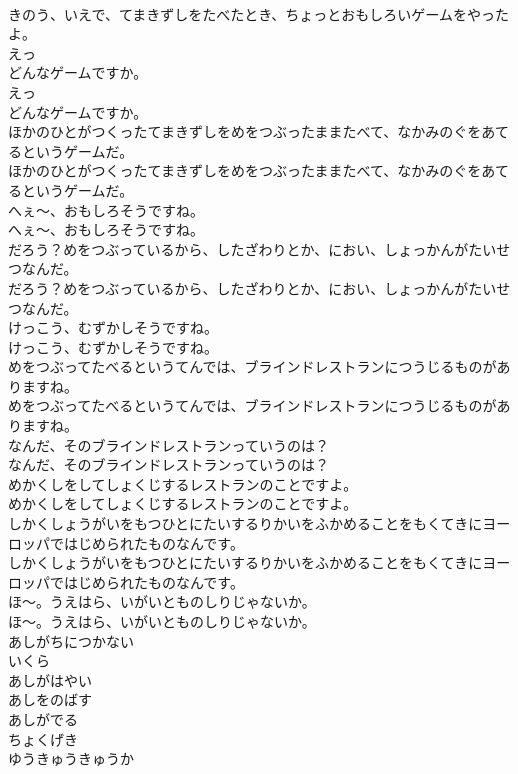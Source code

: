 \documentclass[8pt]{extreport}
\begin{document}
\begin{CJK}{UTF8}{min}
\\	きのう、いえで、てまきずしをたべたとき、ちょっとおもしろいゲームをやったよ。
\\	えっ
\\	どんなゲームですか。
\\	えっ
\\	どんなゲームですか。
\\	ほかのひとがつくったてまきずしをめをつぶったままたべて、なかみのぐをあてるというゲームだ。
\\	ほかのひとがつくったてまきずしをめをつぶったままたべて、なかみのぐをあてるというゲームだ。
\\	へぇ～、おもしろそうですね。
\\	へぇ～、おもしろそうですね。
\\	だろう？めをつぶっているから、したざわりとか、におい、しょっかんがたいせつなんだ。
\\	だろう？めをつぶっているから、したざわりとか、におい、しょっかんがたいせつなんだ。
\\	けっこう、むずかしそうですね。
\\	けっこう、むずかしそうですね。
\\	めをつぶってたべるというてんでは、ブラインドレストランにつうじるものがありますね。
\\	めをつぶってたべるというてんでは、ブラインドレストランにつうじるものがありますね。
\\	なんだ、そのブラインドレストランっていうのは？
\\	なんだ、そのブラインドレストランっていうのは？
\\	めかくしをしてしょくじするレストランのことですよ。
\\	めかくしをしてしょくじするレストランのことですよ。
\\	しかくしょうがいをもつひとにたいするりかいをふかめることをもくてきにヨーロッパではじめられたものなんです。
\\	しかくしょうがいをもつひとにたいするりかいをふかめることをもくてきにヨーロッパではじめられたものなんです。
\\	ほ～。うえはら、いがいとものしりじゃないか。
\\	ほ～。うえはら、いがいとものしりじゃないか。
\\	あしがちにつかない
\\	いくら
\\	あしがはやい
\\	あしをのばす
\\	あしがでる
\\	ちょくげき
\\	ゆうきゅうきゅうか

\end{CJK}
\end{document}
